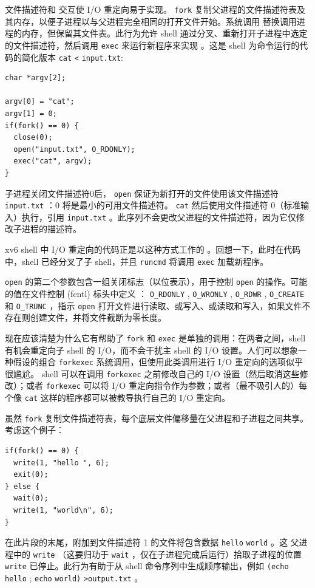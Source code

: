 文件描述符和
        交互使 I/O 重定向易于实现。
    \lstinline{fork}    复制父进程的文件描述符表及其内存，以便子进程以与父进程完全相同的打开文件开始。系统调用
        替换调用进程的内存，但保留其文件表。此行为允许 shell 通过分叉、重新打开子进程中选定的文件描述符，然后调用    \lstinline{exec}    来运行新程序来实现       。这是 shell 为命令运行的代码的简化版本
\lstinline{cat}
\lstinline{<}
\lstinline{input.txt}:

\begin{lstlisting}[]
char *argv[2];

argv[0] = "cat";
argv[1] = 0;
if(fork() == 0) {
  close(0);
  open("input.txt", O_RDONLY);
  exec("cat", argv);
}
\end{lstlisting}   子进程关闭文件描述符0后，
    \lstinline{open}    保证为新打开的文件使用该文件描述符
    \lstinline{input.txt}    ：0 将是最小的可用文件描述符。
    \lstinline{cat}    然后使用文件描述符 0（标准输入）执行，引用
    \lstinline{input.txt}    。此序列不会更改父进程的文件描述符，因为它仅修改子进程的描述符。  

xv6 shell 中 I/O 重定向的代码正是以这种方式工作的
        。回想一下，此时在代码中，shell 已经分叉了子 shell，并且
    \lstinline{runcmd}    将调用
    \lstinline{exec}    加载新程序。  

   \lstinline{open}    的第二个参数包含一组关闭标志（以位表示），用于控制    \lstinline{open}    的操作。可能的值在文件控制 (fcntl) 标头中定义
       ：
    \lstinline{O_RDONLY}    ,
    \lstinline{O_WRONLY}    ,
    \lstinline{O_RDWR}    ,
    \lstinline{O_CREATE}    和
    \lstinline{O_TRUNC}    ，指示    \lstinline{open}    打开文件进行读取、或写入、或读取和写入，如果文件不存在则创建文件，并将文件截断为零长度。  

现在应该清楚为什么它有帮助了
    \lstinline{fork}    和
    \lstinline{exec}    是单独的调用：在两者之间，shell 有机会重定向子 shell 的 I/O，而不会干扰主 shell 的 I/O 设置。人们可以想象一种假设的组合
    \lstinline{forkexec}    系统调用，但使用此类调用进行 I/O 重定向的选项似乎很尴尬。 shell 可以在调用    \lstinline{forkexec}    之前修改自己的 I/O 设置（然后取消这些修改）；或者
    \lstinline{forkexec}    可以将 I/O 重定向指令作为参数；或者（最不吸引人的）每个像    \lstinline{cat}    这样的程序都可以被教导执行自己的 I/O 重定向。  

虽然
    \lstinline{fork}    复制文件描述符表，每个底层文件偏移量在父进程和子进程之间共享。考虑这个例子：
\begin{lstlisting}[]
if(fork() == 0) {
  write(1, "hello ", 6);
  exit(0);
} else {
  wait(0);
  write(1, "world\n", 6);
}
\end{lstlisting}   在此片段的末尾，附加到文件描述符 1 的文件将包含数据
    \lstinline{hello}   
    \lstinline{world}    。这
 父进程中的    \lstinline{write}    （这要归功于
    \lstinline{wait}   ，仅在子进程完成后运行）拾取子进程的位置
    \lstinline{write}    已停止。此行为有助于从 shell 命令序列中生成顺序输出，例如
    \lstinline{(echo}   
    \lstinline{hello}   ;
    \lstinline{echo}   
    \lstinline{world)}   
    \lstinline{>output.txt}    。  

